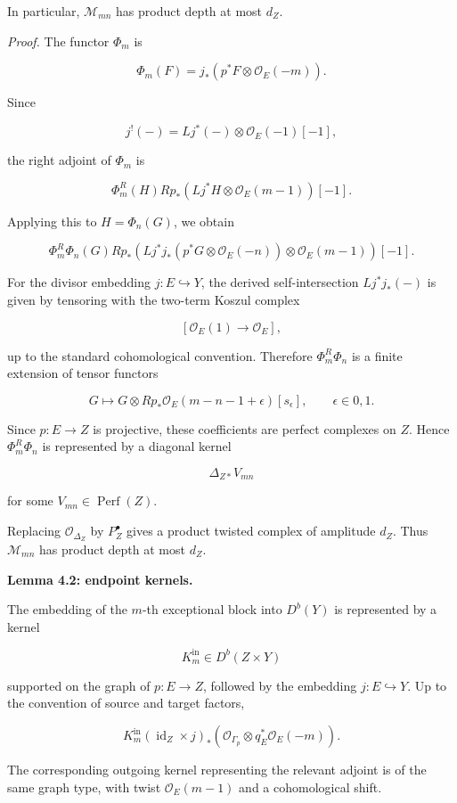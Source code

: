 \documentclass[11pt]{amsart}
\theoremstyle{definition}
\begin{document}
In particular, $\mathcal M_{mn}$ has product depth at most $d_Z$.

\noindent\emph{Proof.} The functor $\Phi_m$ is

\[
\Phi_m(F)=j_*(p^*F\otimes\mathcal O_E(-m)).
\]

Since

\[
j^!(-)=Lj^*(-)\otimes\mathcal O_E(-1)[-1],
\]

the right adjoint of $\Phi_m$ is

\[
\Phi_m^R(H)
Rp_*\left(
Lj^*H\otimes\mathcal O_E(m-1)
\right)[-1].
\tag{4.1}
\]

Applying this to $H=\Phi_n(G)$, we obtain

\[
\Phi_m^R\Phi_n(G)
Rp_*\left(
Lj^*j_*(p^*G\otimes\mathcal O_E(-n))
\otimes\mathcal O_E(m-1)
\right)[-1].
\]

For the divisor embedding $j:E\hookrightarrow Y$, the derived self-intersection $Lj^*j_*(-)$ is given by tensoring with the two-term Koszul complex

\[
[\mathcal O_E(1)\to \mathcal O_E],
\]

up to the standard cohomological convention. Therefore $\Phi_m^R\Phi_n$ is a finite extension of tensor functors

\[
G\longmapsto
G\otimes Rp_*\mathcal O_E(m-n-1+\epsilon)[s_\epsilon],
\qquad
\epsilon\in{0,1}.
\]

Since $p:E\to Z$ is projective, these coefficients are perfect complexes on $Z$. Hence $\Phi_m^R\Phi_n$ is represented by a diagonal kernel

\[
\Delta_{Z*}V_{mn}
\]

for some $V_{mn}\in \operatorname{Perf}(Z)$.

Replacing $\mathcal O_{\Delta_Z}$ by $P_Z^\bullet$ gives a product twisted complex of amplitude $d_Z$. Thus $\mathcal M_{mn}$ has product depth at most $d_Z$.

\noindent\textbf{Lemma 4.2: endpoint kernels.}

The embedding of the $m$-th exceptional block into $D^b(Y)$ is represented by a kernel

\[
K_m^{\mathrm{in}}\in D^b(Z\times Y)
\]

supported on the graph of $p:E\to Z$, followed by the embedding $j:E\hookrightarrow Y$. Up to the convention of source and target factors,

\[
K_m^{\mathrm{in}}
(\operatorname{id}_Z\times j)_*
\left(
\mathcal O_{\Gamma_p}\otimes q_E^*\mathcal O_E(-m)
\right).
\]

The corresponding outgoing kernel representing the relevant adjoint is of the same graph type, with twist $\mathcal O_E(m-1)$ and a cohomological shift.
\end{document}
